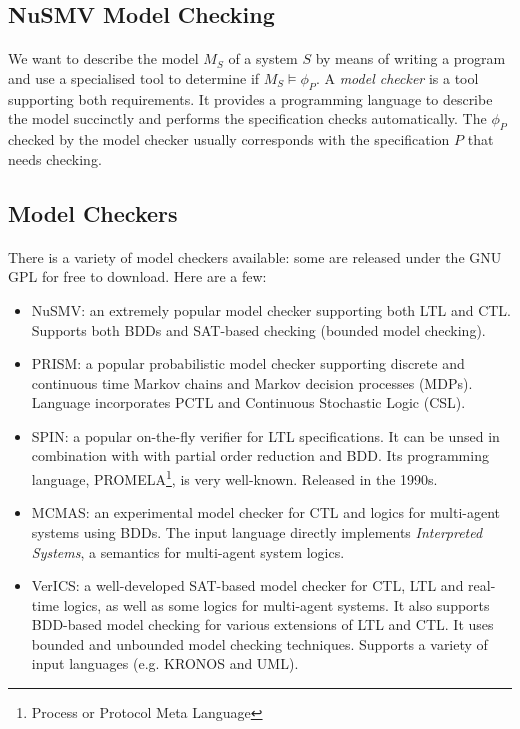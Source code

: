 \documentclass{article}
\theoremstyle{plain}
\theoremstyle{definition}
\begin{document}
\begin{multicols}{2}
\section{NuSMV Model Checking}

\paragraph{} We want to describe the model $M_S$ of a system $S$ by means of writing a program and use a specialised tool to determine if $M_S \models \phi_P$. A \textit{model checker} is a tool supporting both requirements. It provides a programming language to describe the model succinctly and performs the specification checks automatically. The $\phi_P$ checked by the model checker usually corresponds with the specification $P$ that needs checking.

\subsection{Model Checkers}

\paragraph{} There is a variety of model checkers available: some are released under the GNU GPL for free to download. Here are a few:

\begin{itemize}
\item NuSMV: an extremely popular model checker supporting both LTL and CTL. Supports both BDDs and SAT-based checking (bounded model checking). 
\item PRISM: a popular probabilistic model checker supporting discrete and continuous time Markov chains and Markov decision processes (MDPs). Language incorporates PCTL and Continuous Stochastic Logic (CSL).
\item SPIN: a popular on-the-fly verifier for LTL specifications. It can be unsed in combination with with partial order reduction and BDD. Its programming language, PROMELA\footnote{Process or Protocol Meta Language}, is very well-known. Released in the 1990s.
\item MCMAS: an experimental model checker for CTL and logics for multi-agent systems using BDDs. The input language directly implements \textit{Interpreted Systems}, a semantics for multi-agent system logics.
\item VerICS: a well-developed SAT-based model checker for CTL, LTL and real-time logics, as well as some logics for multi-agent systems. It also supports BDD-based model checking for various extensions of LTL and CTL. It uses bounded and unbounded model checking techniques. Supports a variety of input languages (e.g. KRONOS and UML).
\end{itemize}


\end{multicols}
\end{document}
